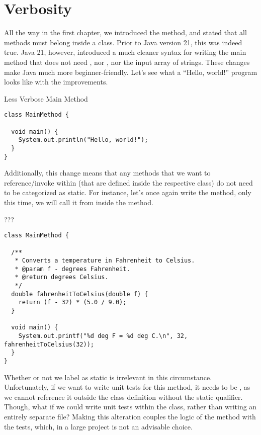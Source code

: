 \section{Verbosity}

All the way in the first chapter, we introduced the  method, and stated that all methods must belong inside a class. Prior to Java version 21, this was indeed true. Java 21, however, introduced a much cleaner syntax for writing the main method that does not need , nor , nor the input array of strings. These changes make Java much more beginner-friendly. Let's see what a ``Hello, world!'' program looks like with the improvements.

\begin{cl}[]{Less Verbose Main Method}
\begin{lstlisting}[language=MyJava]
class MainMethod {

  void main() {
    System.out.println("Hello, world!");
  }
}
\end{lstlisting}
\end{cl}

Additionally, this change means that any methods that we want to reference/invoke within  (that are defined inside the respective class) do not need to be categorized as static. For instance, let's once again write the  method, only this time, we will call it from inside the  method.

\begin{cl}[]{???}
\begin{lstlisting}[language=MyJava]
class MainMethod {

  /**
   * Converts a temperature in Fahrenheit to Celsius.
   * @param f - degrees Fahrenheit.
   * @return degrees Celsius.
   */
  double fahrenheitToCelsius(double f) {
    return (f - 32) * (5.0 / 9.0);
  }
  
  void main() {
    System.out.printf("%d deg F = %d deg C.\n", 32, fahrenheitToCelsius(32));
  }
}
\end{lstlisting}
\end{cl}

Whether or not we label  as static is irrelevant in this circumstance. Unfortunately, if we want to write unit tests for this method, it needs to be , as we cannot reference it outside the class definition without the static qualifier. Though, what if we could write unit tests within the  class, rather than writing an entirely separate file? Making this alteration couples the logic of the method with the tests, which, in a large project is not an advisable choice. 

